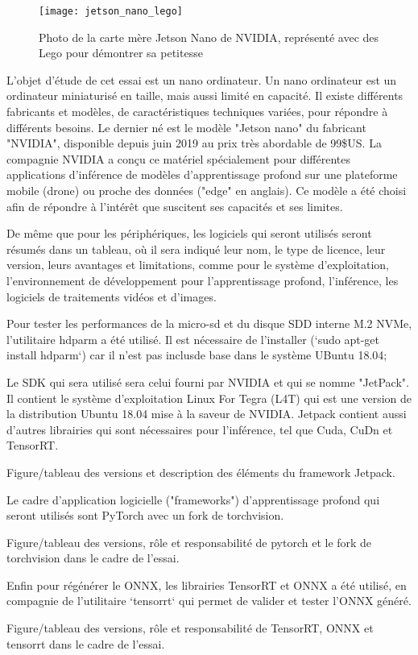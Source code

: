 ﻿
\label{jetson_nano_lego}
\begin{figure}[H]
    \centering
    \texttt{[image: jetson\_nano\_lego]}
    \caption{Photo de la carte mère Jetson Nano de NVIDIA, représenté avec des Lego pour démontrer sa petitesse}
    \label{fig:jetson_nano_lego}
\end{figure}
\par L'objet d'étude de cet essai est un nano ordinateur. Un nano ordinateur est un ordinateur miniaturisé en taille, mais aussi limité en capacité. Il existe différents fabricants et modèles, de caractéristiques techniques variées, pour répondre à différents besoins. Le dernier né est le modèle "Jetson nano" du fabricant "NVIDIA", disponible depuis juin 2019 au prix très abordable de 99\$US. La compagnie NVIDIA a conçu ce matériel spécialement pour différentes applications d'inférence de modèles d'apprentissage profond sur une plateforme mobile (drone) ou proche des données ("edge" en anglais). Ce modèle a été choisi afin de répondre à l'intérêt que suscitent ses capacités et ses limites. 
\par De même que pour les périphériques, les logiciels qui seront utilisés seront résumés dans un tableau, où il sera indiqué leur nom, le type de licence, leur version, leurs avantages et limitations, comme pour le système d'exploitation, l'environnement de développement pour l'apprentissage profond, l'inférence, les logiciels de traitements vidéos et d'images. 
\par Pour tester les performances de la micro-sd et du disque SDD interne M.2 NVMe, l'utilitaire hdparm a été utilisé. Il est nécessaire de l'installer (`sudo apt-get install hdparm`) car il n'est pas inclusde base dans le système UBuntu 18.04;
\par Le SDK qui sera utilisé sera celui fourni par NVIDIA et qui se nomme "JetPack". Il contient le système d'exploitation Linux For Tegra (L4T) qui est une version de la distribution Ubuntu 18.04 mise à la saveur de NVIDIA. Jetpack contient aussi d'autres librairies qui sont nécessaires pour l'inférence, tel que Cuda, CuDn et TensorRT.
{\color{red} \par Figure/tableau des versions et description des éléments du framework Jetpack. }
\par Le cadre d'application logicielle ("frameworks") d’apprentissage profond qui seront utilisés sont PyTorch avec un fork de torchvision.
{\color{red} \par Figure/tableau des versions, rôle et responsabilité de pytorch et le fork de torchvision dans le cadre de l'essai. }
\par Enfin pour régénérer le ONNX, les librairies TensorRT et ONNX a été utilisé, en compagnie de l'utilitaire `tensorrt` qui permet de valider et tester l'ONNX généré.
{\color{red} \par Figure/tableau des versions, rôle et responsabilité de TensorRT, ONNX et tensorrt dans le cadre de l'essai. }